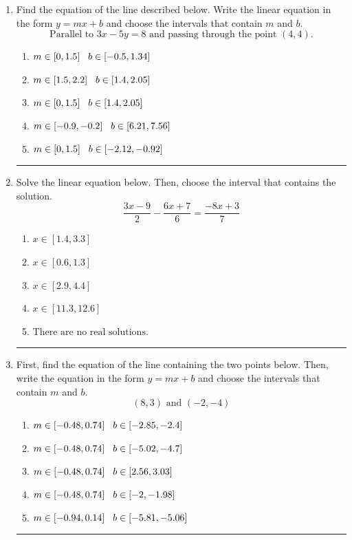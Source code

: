 \documentclass[14pt]{extbook}
\newcommand{\litem}[1]{\item#1\hspace*{-1cm}\rule{\textwidth}{0.4pt}}
\begin{document}
\begin{enumerate}
{\begin{enumerate}[label=\Alph*.]
\end{enumerate} }
\litem{
Find the equation of the line described below. Write the linear equation in the form $ y=mx+b $ and choose the intervals that contain $m$ and $b$.\[ \text{Parallel to } 3 x - 5 y = 8 \text{ and passing through the point } (4, 4). \]\begin{enumerate}[label=\Alph*.]
\item \( m \in [0, 1.5] \hspace*{3mm} b \in [-0.5, 1.34] \)
\item \( m \in [1.5, 2.2] \hspace*{3mm} b \in [1.4, 2.05] \)
\item \( m \in [0, 1.5] \hspace*{3mm} b \in [1.4, 2.05] \)
\item \( m \in [-0.9, -0.2] \hspace*{3mm} b \in [6.21, 7.56] \)
\item \( m \in [0, 1.5] \hspace*{3mm} b \in [-2.12, -0.92] \)

\end{enumerate} }
\litem{
Solve the linear equation below. Then, choose the interval that contains the solution.\[ \frac{3x -9}{2} - \frac{6x + 7}{6} = \frac{-8x + 3}{7} \]\begin{enumerate}[label=\Alph*.]
\item \( x \in [1.4, 3.3] \)
\item \( x \in [0.6, 1.3] \)
\item \( x \in [2.9, 4.4] \)
\item \( x \in [11.3, 12.6] \)
\item \( \text{There are no real solutions.} \)

\end{enumerate} }
\litem{
First, find the equation of the line containing the two points below. Then, write the equation in the form $ y=mx+b $ and choose the intervals that contain $m$ and $b$.\[ (8, 3) \text{ and } (-2, -4) \]\begin{enumerate}[label=\Alph*.]
\item \( m \in [-0.48, 0.74] \hspace*{3mm} b \in [-2.85, -2.4] \)
\item \( m \in [-0.48, 0.74] \hspace*{3mm} b \in [-5.02, -4.7] \)
\item \( m \in [-0.48, 0.74] \hspace*{3mm} b \in [2.56, 3.03] \)
\item \( m \in [-0.48, 0.74] \hspace*{3mm} b \in [-2, -1.98] \)
\item \( m \in [-0.94, 0.14] \hspace*{3mm} b \in [-5.81, -5.06] \)


\end{enumerate}}
\end{enumerate}
\end{document}
